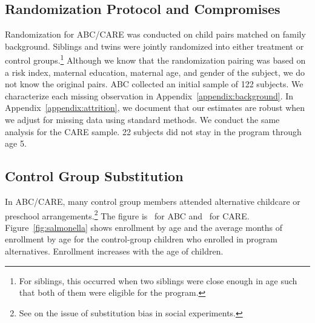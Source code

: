 \subsection{Randomization Protocol and Compromises} \label{section:randomization}

Randomization for ABC/CARE was conducted on child pairs matched on family background. Siblings and twins were jointly randomized into either treatment or control groups.\footnote{For siblings, this occurred when two siblings were close enough in age such that both of them were eligible for the program.} Although we know that the randomization pairing was based on a risk index, maternal education, maternal age, and gender of the subject, we do not know the original pairs. ABC collected an initial sample of 122 subjects. We characterize each missing observation in Appendix~\ref{appendix:background}. In Appendix~\ref{appendix:attrition}, we document that our estimates are robust when we adjust for missing data using standard methods. We conduct the same analysis for the CARE sample. 22 subjects did not stay in the program through age 5.

\subsection{Control Group Substitution}

In ABC/CARE, many control group members attended alternative childcare or preschool arrangements.\footnote{See \cite{Heckman_Hohmann_etal_2000_QJE} on the issue of substitution bias in social experiments.} The figure is \treatsubsabc\ for ABC and \treatsubscarec\ for CARE. Figure~\ref{fig:salmonella} shows enrollment by age and the average months of enrollment by age for the control-group children who enrolled in program alternatives. Enrollment increases with the age of children.

